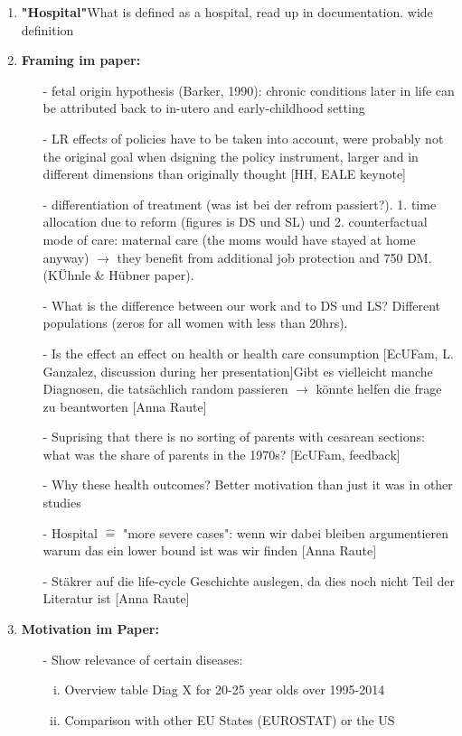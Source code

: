 \documentclass[11pt,a4paper]{article}
\begin{document}
{\begin{enumerate}
\item \textbf{"Hospital"}\newline What is defined as a hospital, read up in documentation. wide definition


\item \textbf{Framing im paper:} \vspace{-1em}
\begin{itemize}
	\item[-] fetal origin hypothesis (Barker, 1990): chronic conditions later in life can be attributed back to in-utero and early-childhood setting
	\item[-] LR effects of policies have to be taken into account, were probably not the original goal when dsigning the policy instrument, larger and in different dimensions than originally thought [HH, EALE keynote]
	\item[-] differentiation of treatment (was ist bei der refrom passiert?). 1. time allocation due to reform (figures is DS und SL) und 2. counterfactual mode of care: maternal care (the moms would have stayed at home anyway) $\rightarrow$ they benefit from additional job protection and 750 DM.
	(KÜhnle \& Hübner paper).
	\item[-] What is the difference between our work and to DS und LS? Different populations (zeros for all women with less than 20hrs).
	\item[-] Is the effect an effect on health or health care consumption [EcUFam, L. Ganzalez, discussion during her presentation]\newline Gibt es vielleicht manche Diagnosen, die tatsächlich random passieren $\rightarrow$ könnte helfen die frage zu beantworten [Anna Raute]
	\item[-] Suprising that there is no sorting of parents with cesarean sections: what was the share of parents in the 1970s? [EcUFam, feedback]
	\item[-] Why these health outcomes? Better motivation than just it was in other studies
	\item[-] Hospital $\mathrel{\widehat{=}}$ "more severe cases": wenn wir dabei bleiben argumentieren warum das ein lower bound ist was wir finden [Anna Raute]
	\item[-] Stäkrer auf die life-cycle Geschichte auslegen, da dies noch nicht Teil der Literatur ist [Anna Raute]
\end{itemize}

\item \textbf{Motivation im Paper:}
\begin{itemize}
	\item[-] Show relevance of certain diseases: 
	\begin{enumerate}[(i)]
	\item Overview table Diag X for 20-25 year olds over 1995-2014
	\item Comparison with other EU States (EUROSTAT) or the US
	\end{enumerate}
\end{itemize}


\end{enumerate}}
\end{document}
